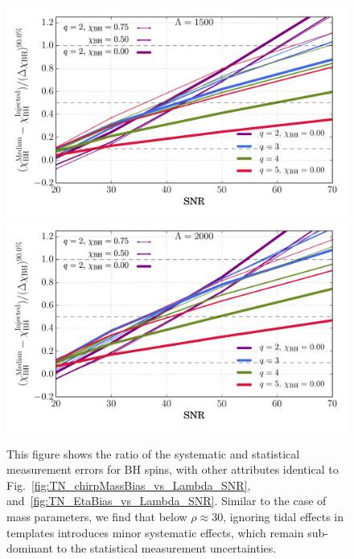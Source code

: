 \documentclass[aps,prd,amsmath,floats,floatfix, twocolumn,
superscriptaddress,nofootinbib,showpacs]{revtex4-1}
\begin{document}
\begin{figure}
\includegraphics[width=0.8\columnwidth]{plots/TNChiBHBiasesOverCIWidthsVsSNR_Lambda1500_CI90_0}
\includegraphics[width=0.8\columnwidth]{plots/TNChiBHBiasesOverCIWidthsVsSNR_Lambda2000_CI90_0}
\caption{This figure shows the ratio of the systematic and statistical
measurement errors for BH spins, with other attributes identical to 
Fig.~\ref{fig:TN_chirpMassBias_vs_Lambda_SNR}, and~\ref{fig:TN_EtaBias_vs_Lambda_SNR}.
Similar to the case of mass parameters, we find that below $\rho\approx 30$,
ignoring tidal effects in templates introduces minor systematic effects,
which remain sub-dominant to the statistical measurement uncertainties.
}
\label{fig:TN_BHspinBias_vs_Lambda_SNR}
\end{figure}
%
% 
\end{document}
